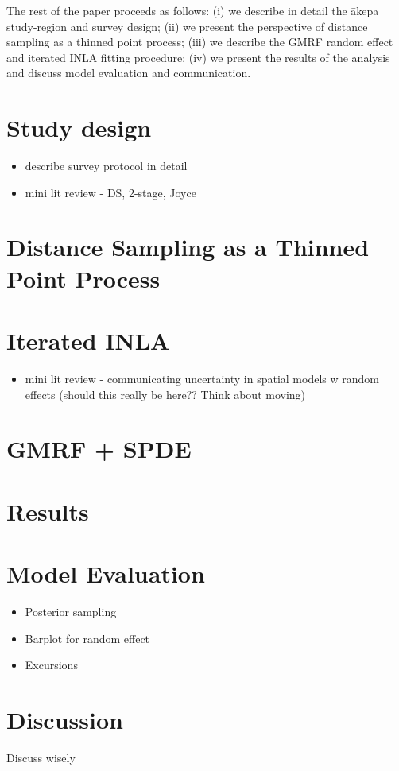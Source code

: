 \documentclass[preprint,12pt]{elsarticle}
\newcommand{\akepa}{\textquotesingle\={a}kepa}  %
\begin{document}
The rest of the paper proceeds as follows:  (i) we describe in detail the \akepa{} study-region and survey design; (ii) we present the perspective of distance sampling as a thinned point process; (iii) we describe the GMRF random effect and iterated INLA fitting procedure; (iv) we present the results of the analysis and discuss model evaluation and communication.

\section{Study design}

\begin{itemize}
	\item describe survey protocol in detail
	\item mini lit review - DS, 2-stage, Joyce
\end{itemize}

\section{Distance Sampling as a Thinned Point Process}

\section{Iterated INLA}

\begin{itemize}
	\item mini lit review - communicating uncertainty in spatial models w random effects
	(should this really be here??  Think about moving)
\end{itemize}

\section{GMRF + SPDE}

\section{Results}

\section{Model Evaluation}

\begin{itemize}
	\item Posterior sampling
	\item Barplot for random effect
	\item Excursions
\end{itemize}

\section{Discussion}

Discuss wisely



\end{document}

